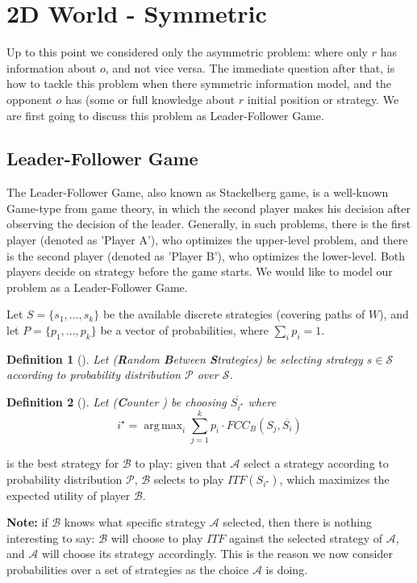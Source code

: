 \documentclass[a4paper,10pt]{article}
\newtheorem{definition}{Definition}
\newcommand{\fb}[1]{\dofb#1}
\newcommand{\dofb}[1]{\textbf{#1}}
\newcommand\rob{\ensuremath{r}\xspace}
\newcommand\opp{\ensuremath{o}\xspace}
\newcommand{\w}{\ensuremath{W}\xspace}
\newcommand{\fcc}{\ensuremath{FCC}\xspace}
\newcommand{\itf}{\ensuremath{ITF}\xspace}
\newcommand{\A}{\ensuremath{\mathcal{A}}\xspace}
\newcommand{\B}{\ensuremath{\mathcal{B}}\xspace}
\DeclareMathOperator*{\argmax}{arg\,max} %
\begin{document}
\section{2D World - Symmetric}
Up to this point we considered only the asymmetric problem: where only \rob has information about \opp, and not vice versa. The immediate question after that, is how to tackle this problem when there symmetric information model, and the opponent \opp has (some or full knowledge about \rob initial position or strategy.
We are first going to discuss this problem as Leader-Follower Game.

\subsection{Leader-Follower Game}
The Leader-Follower Game, also known as Stackelberg game, is a well-known Game-type from game theory, in which the second player makes his decision after observing the decision of the leader. 
Generally, in such problems, there is the first player (denoted as 'Player A'), who optimizes the upper-level problem, and there is the second player (denoted as 'Player B'), who optimizes the lower-level. Both players decide on strategy before the game starts. We would like to model our problem as a Leader-Follower Game.

Let $S=\{s_1,\hdots,s_k\}$ be the available discrete strategies (covering paths of \w), and let $P=\{p_1,...,p_k\}$ be a vector of probabilities, where $\sum_i p_i=1$.

\begin{definition} [\rbs]
Let \rbs (\fb{Random} \fb{Between} \fb{Strategies}) be selecting strategy $s \in \mathcal{S}$ according to probability distribution $\mathcal{P}$ over $\mathcal{S}$. 
\end{definition}


\begin{definition}[\crbs]
Let \crbs (\fb{Counter} \rbs) be choosing $\overline{S_{i^\star}}$ where \[i^\star=\argmax_i\sum_{j=1}^{k} p_i\cdot\fcc_B(S_j,\overline{S_i})\]
\end{definition}

\crbs is the best strategy for \B to play: given that \A select a strategy according to probability distribution $\mathcal{P}$, \B selects to play $\itf(S_{i^\star})$, which maximizes the expected utility of player \B.

\textbf{Note:} if \B knows what specific strategy \A selected, then there is nothing interesting to say: \B will choose to play \itf against the selected strategy of \A, and \A will choose its strategy accordingly. This is the reason we now consider probabilities over a set of strategies as the choice \A is doing.
\end{document}
